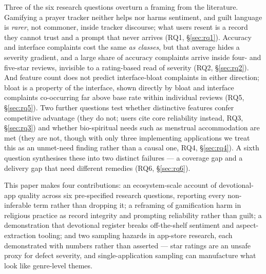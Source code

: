 Three of the six research questions overturn a framing from the literature.
Gamifying a prayer tracker neither helps nor harms sentiment, and guilt
language is \emph{rarer}, not commoner, inside tracker discourse; what users
resent is a record they cannot trust and a prompt that never arrives (RQ1,
\S\ref{sec:rq1}). Accuracy and interface complaints cost the same \emph{as
classes}, but that average hides a severity gradient, and a large share of
accuracy complaints arrive inside four- and five-star reviews, invisible to a
rating-based read of severity (RQ2, \S\ref{sec:rq2}). And feature count does
not predict interface-bloat complaints in either direction; bloat is a property
of the interface, shown directly by bloat and interface complaints co-occurring
far above base rate within individual reviews (RQ5, \S\ref{sec:rq5}). Two
further questions test whether distinctive features confer competitive
advantage (they do not; users cite core reliability instead, RQ3,
\S\ref{sec:rq3}) and whether bio-spiritual needs such as menstrual
accommodation are met (they are not, though with only three implementing
applications we treat this as an unmet-need finding rather than a causal one,
RQ4, \S\ref{sec:rq4}). A sixth question synthesises these into two distinct
failures --- a coverage gap and a delivery gap that need different remedies
(RQ6, \S\ref{sec:rq6}).

This paper makes four contributions: an ecosystem-scale account of
devotional-app quality across six pre-specified research questions, reporting
every non-inferable term rather than dropping it; a reframing of gamification
harm in religious practice as record integrity and prompting reliability rather
than guilt; a demonstration that devotional register breaks off-the-shelf
sentiment and aspect-extraction tooling; and two sampling hazards in app-store
research, each demonstrated with numbers rather than asserted --- star ratings
are an unsafe proxy for defect severity, and single-application sampling can
manufacture what look like genre-level themes.
